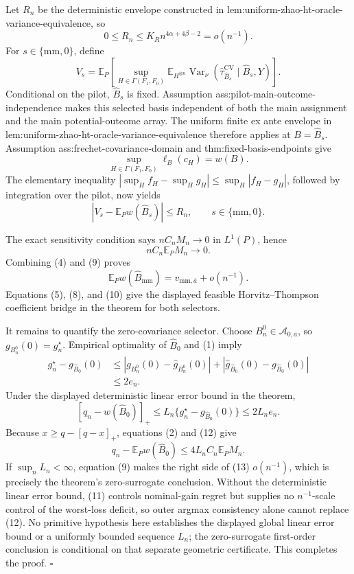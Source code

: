 Let \(R_n\) be the deterministic envelope constructed in lem:uniform-zhao-ht-oracle-variance-equivalence, so
\[
 0\leq R_n\leq K_Rn^{4\alpha+4\beta-2}=o(n^{-1}).
 \tag{5}
\]
For \(s\in\{\mathrm{mm},0\}\), define
\[
 V_s=
 \mathbb E_P\!\left[
 \sup_{H\in\Gamma(F_1,F_0)}
 \mathbb E_{H^{\otimes n}}
 \operatorname{Var}_\nu
 (\widehat\tau_{\widehat B_s}^{\mathrm{CV}}\mid\widehat B_s,Y)
 \right].
 \tag{6}
\]
Conditional on the pilot, \(\widehat B_s\) is fixed.  Assumption ass:pilot-main-outcome-independence makes this selected basis independent of both the main assignment and the main potential-outcome array.  The uniform finite ex ante envelope in lem:uniform-zhao-ht-oracle-variance-equivalence therefore applies at \(B=\widehat B_s\).  Assumption ass:frechet-covariance-domain and thm:fixed-basis-endpoints give
\[
 \sup_{H\in\Gamma(F_1,F_0)}\ell_B(c_H)=w(B).
 \tag{7}
\]
The elementary inequality \(|\sup_Hf_H-\sup_Hg_H|\leq\sup_H|f_H-g_H|\), followed by integration over the pilot, now yields
\[
 |V_s-\mathbb E_Pw(\widehat B_s)|\leq R_n,
 \qquad s\in\{\mathrm{mm},0\}.
 \tag{8}
\]

The exact sensitivity condition says \(nC_nM_n\to0\) in \(L^1(P)\), hence
\[
 nC_n\mathbb E_PM_n\longrightarrow0.
 \tag{9}
\]
Combining (4) and (9) proves
\[
 \mathbb E_Pw(\widehat B_{\mathrm{mm}})
 =v_{\mathrm{mm},\overline a}+o(n^{-1}).
 \tag{10}
\]
Equations (5), (8), and (10) give the displayed feasible Horvitz--Thompson coefficient bridge in the theorem for both selectors.

It remains to quantify the zero-covariance selector.  Choose \(B_n^0\in\mathcal A_{0,\overline a}\), so \(g_{B_n^0}(0)=g_n^\star\).  Empirical optimality of \(\widehat B_0\) and (1) imply
\[
 \begin{aligned}
 g_n^\star-g_{\widehat B_0}(0)
 &\leq
 |g_{B_n^0}(0)-\widehat g_{B_n^0}(0)|
 +|\widehat g_{\widehat B_0}(0)-g_{\widehat B_0}(0)|\\
 &\leq2e_n.
 \end{aligned}
 \tag{11}
\]
Under the displayed deterministic linear error bound in the theorem,
\[
 [q_n-w(\widehat B_0)]_+
 \leq L_n\{g_n^\star-g_{\widehat B_0}(0)\}
 \leq2L_ne_n.
 \tag{12}
\]
Because \(x\geq q-[q-x]_+\), equations (2) and (12) give
\[
 q_n-\mathbb E_Pw(\widehat B_0)
 \leq4L_nC_n\mathbb E_PM_n.
 \tag{13}
\]
If \(\sup_nL_n<\infty\), equation (9) makes the right side of (13) \(o(n^{-1})\), which is precisely the theorem's zero-surrogate conclusion.  Without the deterministic linear error bound, (11) controls nominal-gain regret but supplies no \(n^{-1}\)-scale control of the worst-loss deficit, so outer argmax consistency alone cannot replace (12).  No primitive hypothesis here establishes the displayed global linear error bound or a uniformly bounded sequence \(L_n\); the zero-surrogate first-order conclusion is conditional on that separate geometric certificate.  This completes the proof. \(\square\)